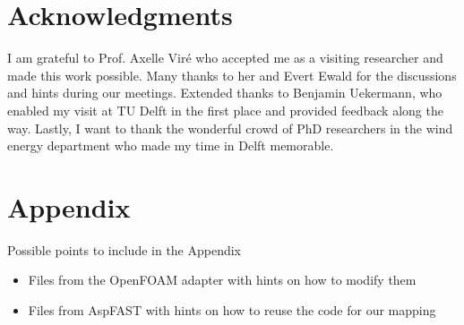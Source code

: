 \documentclass{layout/tudelft-aiaa}
\begin{document}











\section*{Acknowledgments}

I am grateful to Prof. Axelle Viré who accepted me as a visiting researcher and made this work possible. Many thanks to her and Evert Ewald for the discussions and hints during our meetings. Extended thanks to Benjamin Uekermann, who enabled my visit at TU Delft in the first place and provided feedback along the way. Lastly, I want to thank the wonderful crowd of PhD researchers in the wind energy department who made my time in Delft memorable.


\printbibliography


\section*{Appendix}

Possible points to include in the Appendix
\begin{itemize}
	\item Files from the OpenFOAM adapter with hints on how to modify them
	\item Files from AspFAST with hints on how to reuse the code for our mapping
\end{itemize}
\end{document}
